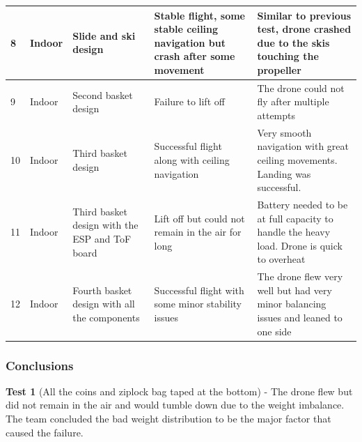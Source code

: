 \documentclass[12pt]{article}
\begin{document}
\begin{longtable}{ | m{1.5cm} | m{2cm}| m{3cm} | m{4cm} | m{4cm} |}
                8 & Indoor &
                Slide and ski design &
                Stable flight, some stable ceiling navigation but crash after some movement &
                Similar to previous test, drone crashed due to the skis touching the propeller \\\hline

                9 & Indoor &
                Second basket design &
                Failure to lift off &
                The drone could not fly after multiple attempts \\\hline

                10 & Indoor &
                Third basket design &
                Successful flight along with ceiling navigation &
                Very smooth navigation with great ceiling movements. Landing was successful. \\\hline

                11 & Indoor &
                Third basket design with the ESP and ToF board &
                Lift off but could not remain in the air for long &
                Battery needed to be at full capacity to handle the heavy load. Drone is quick to overheat \\\hline

                12 & Indoor &
                Fourth basket design with all the components &
                Successful flight with some minor stability issues &
                The drone flew very well but had very minor balancing issues and leaned to one side \\\hline

            \end{longtable}

            \newpage

            \subsubsection*{Conclusions}
                \newcommand{\teststatement}[3]{
                    \vspace{0.5cm}\noindent\textbf{#1} (#2) - #3
                }

                \teststatement{Test 1} {All the coins and ziplock bag taped at the bottom} {
                    The drone flew but did not remain in the air and would tumble down due to the weight imbalance.
                    The team concluded the bad weight distribution to be the major factor that caused the failure.
                }
\end{document}
